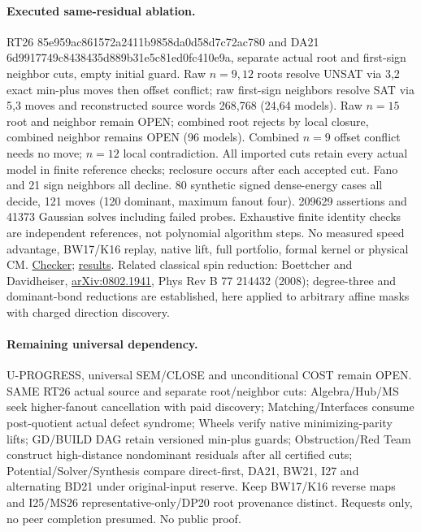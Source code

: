 \documentclass[11pt]{article}
\begin{document}
\paragraph{Executed same-residual ablation.} RT26 85e959ac861572a2411b9858da0d58d7c72ac780 and DA21 6d9917749c8438435d889b31e5c81ed0fc410e9a, separate actual root and first-sign neighbor cuts, empty initial guard. Raw $n=9,12$ roots resolve UNSAT via 3,2 exact min-plus moves then offset conflict; raw first-sign neighbors resolve SAT via 5,3 moves and reconstructed source words 268,768 (24,64 models). Raw $n=15$ root and neighbor remain OPEN; combined root rejects by local closure, combined neighbor remains OPEN (96 models). Combined $n=9$ offset conflict needs no move; $n=12$ local contradiction. All imported cuts retain every actual model in finite reference checks; reclosure occurs after each accepted cut. Fano and 21 sign neighbors all decline. 80 synthetic signed dense-energy cases all decide, 121 moves (120 dominant, maximum fanout four). 209629 assertions and 41373 Gaussian solves including failed probes. Exhaustive finite identity checks are independent references, not polynomial algorithm steps. No measured speed advantage, BW17/K16 replay, native lift, full portfolio, formal kernel or physical CM. \href{https://github.com/j15marti/pnp/commit/465af33a29d343a56a32171c1808b5bf9fd65c63}{Checker}; \href{https://github.com/j15marti/pnp/commit/128b6e88ccb9e4622b4660cb5b3f26a08598f55f}{results}. Related classical spin reduction: Boettcher and Davidheiser, \href{https://arxiv.org/abs/0802.1941}{arXiv:0802.1941}, Phys Rev B 77 214432 (2008); degree-three and dominant-bond reductions are established, here applied to arbitrary affine masks with charged direction discovery.
\paragraph{Remaining universal dependency.} U-PROGRESS, universal SEM/CLOSE and unconditional COST remain OPEN. SAME RT26 actual source and separate root/neighbor cuts: Algebra/Hub/MS seek higher-fanout cancellation with paid discovery; Matching/Interfaces consume post-quotient actual defect syndrome; Wheels verify native minimizing-parity lifts; GD/BUILD DAG retain versioned min-plus guards; Obstruction/Red Team construct high-distance nondominant residuals after all certified cuts; Potential/Solver/Synthesis compare direct-first, DA21, BW21, I27 and alternating BD21 under original-input reserve. Keep BW17/K16 reverse maps and I25/MS26 representative-only/DP20 root provenance distinct. Requests only, no peer completion presumed. No public proof.
\end{document}
